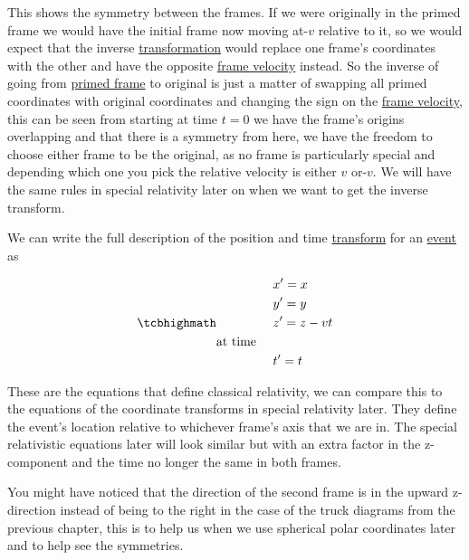 This shows the symmetry between the frames. If we were originally in the primed frame we would have the initial frame now moving at-${v}$ relative to it, so we would expect that the inverse \hyperlink{def-transform}{transformation} would replace one frame's coordinates with the other and have the opposite \hyperlink{def-frame-velocity}{frame velocity} instead.
So the inverse of going from \hyperlink{def-Primed-Frame}{primed frame} to original is just a matter of swapping all primed coordinates with original coordinates and changing the sign on the \hyperlink{def-frame-velocity}{frame velocity}, this can be seen from starting at time ${t} = 0$ we have the frame's origins overlapping and that there is a symmetry from here, we have the freedom to choose either frame to be the original, as no frame is particularly special and depending which one you pick the relative velocity is either ${v}$ or-${v}$. We will have the same rules in special relativity later on when we want to get the inverse transform.

We can write the full description of the position and time \hyperlink{def-transform}{transform} for an \hyperlink{def-event}{event} as

\begin{equation}
	\mhl{
		\begin{aligned}
			 & {x{'}} = {x}        \\
			 & {y{'}} = {y}        \\
			 & {z{'}} = {z}-{v}{t} \\
			\text{at time \ \ \ }  \\
			 & {t{'}}= {t}
		\end{aligned}
	}
	\label{eq: Galilean transformation}
\end{equation}

These are the equations that define classical relativity, we can compare this to the equations of the coordinate transforms in special relativity later. They define the event's location relative to whichever frame's axis that we are in. The special relativistic equations later will look similar but with an extra factor in the z-component and the time no longer the same in both frames.

You might have noticed that the direction of the second frame is in the upward z-direction instead of being to the right in the case of the truck diagrams from the previous chapter, this is to help us when we use spherical polar coordinates later and to help see the symmetries.



